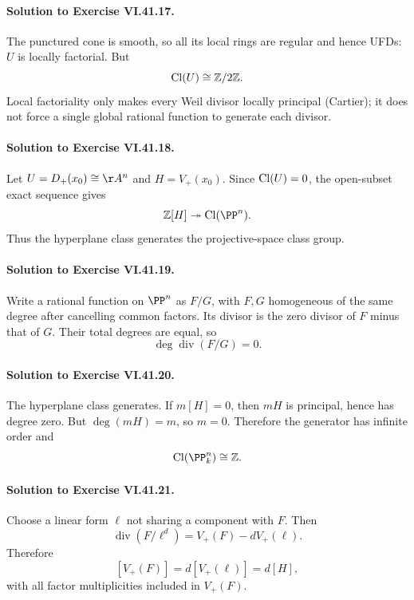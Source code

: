 \paragraph{Solution to Exercise VI.41.17.}
The punctured cone is smooth, so all its local rings are regular and hence UFDs:
\(U\) is locally factorial. But
\[
\operatorname{Cl}(U)\cong\mathbb Z/2\mathbb Z.
\]
Local factoriality only makes every Weil divisor locally principal (Cartier); it does
not force a single global rational function to generate each divisor.

\paragraph{Solution to Exercise VI.41.18.}
Let \(U=D_+(x_0)\cong\AA^n\) and \(H=V_+(x_0)\). Since \(\operatorname{Cl}(U)=0\), the open-subset
exact sequence gives
\[
\mathbb Z[H]\twoheadrightarrow\Cl(\PP^n).
\]
Thus the hyperplane class generates the projective-space class group.

\paragraph{Solution to Exercise VI.41.19.}
Write a rational function on \(\PP^n\) as \(F/G\), with \(F,G\) homogeneous of the
same degree after cancelling common factors. Its divisor is the zero divisor of \(F\)
minus that of \(G\). Their total degrees are equal, so
\[
\deg\operatorname{div}(F/G)=0.
\]

\paragraph{Solution to Exercise VI.41.20.}
The hyperplane class generates. If \(m[H]=0\), then \(mH\) is principal, hence has
degree zero. But \(\deg(mH)=m\), so \(m=0\). Therefore the generator has infinite
order and
\[
\Cl(\PP^n_k)\cong\mathbb Z.
\]

\paragraph{Solution to Exercise VI.41.21.}
Choose a linear form \(\ell\) not sharing a component with \(F\). Then
\[
\operatorname{div}(F/\ell^d)=V_+(F)-dV_+(\ell).
\]
Therefore
\[
[V_+(F)]=d[V_+(\ell)]=d[H],
\]
with all factor multiplicities included in \(V_+(F)\).

